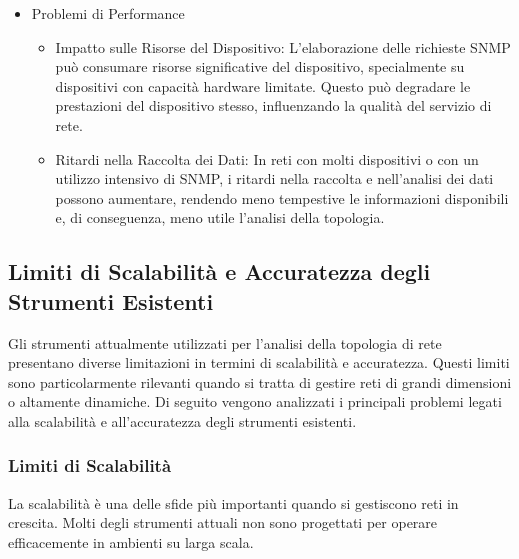 \documentclass[target=bach,aauheader=,style=]{thud}
\begin{document}
\begin{itemize}
  \item Problemi di Performance
    \begin{itemize}
      \item Impatto sulle Risorse del Dispositivo: L'elaborazione delle richieste SNMP può consumare risorse significative del dispositivo, specialmente su dispositivi con capacità hardware limitate. Questo può degradare le prestazioni del dispositivo stesso, influenzando la qualità del servizio di rete.
      \item Ritardi nella Raccolta dei Dati: In reti con molti dispositivi o con un utilizzo intensivo di SNMP, i ritardi nella raccolta e nell'analisi dei dati possono aumentare, rendendo meno tempestive le informazioni disponibili e, di conseguenza, meno utile l'analisi della topologia.
    \end{itemize}
\end{itemize}


\subsection{Limiti di Scalabilità e Accuratezza degli Strumenti Esistenti}
Gli strumenti attualmente utilizzati per l'analisi della topologia di rete presentano diverse limitazioni in termini di scalabilità e accuratezza. Questi limiti sono particolarmente rilevanti quando si tratta di gestire reti di grandi dimensioni o altamente dinamiche. Di seguito vengono analizzati i principali problemi legati alla scalabilità e all'accuratezza degli strumenti esistenti.

\subsubsection{Limiti di Scalabilità}
La scalabilità è una delle sfide più importanti quando si gestiscono reti in crescita. Molti degli strumenti attuali non sono progettati per operare efficacemente in ambienti su larga scala.
\end{document}
